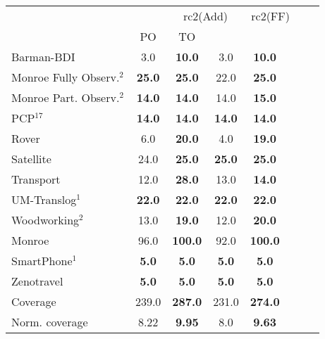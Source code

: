 \begin{tabular}{lccccccl} 
\toprule 
  && \multicolumn{2}{c}{rc2(Add)} & \multicolumn{2}{c}{rc2(FF)} \\ 
\cmidrule(lr){3-4} \cmidrule(lr){5-6}  
 &PO & TO  \\ 
\midrule 
Barman-BDI & 3.0 & \textbf{10.0} & 3.0 & \textbf{10.0}  \\ 
Monroe Fully Observ.$^{2}$ & \textbf{25.0} & \textbf{25.0} & 22.0 & \textbf{25.0}  \\ 
Monroe Part. Observ.$^{2}$ & \textbf{14.0} & \textbf{14.0} & 14.0 & \textbf{15.0}  \\ 
PCP$^{17}$ & \textbf{14.0} & \textbf{14.0} & \textbf{14.0} & \textbf{14.0}  \\ 
Rover & 6.0 & \textbf{20.0} & 4.0 & \textbf{19.0}  \\ 
Satellite & 24.0 & \textbf{25.0} & \textbf{25.0} & \textbf{25.0}  \\ 
Transport & 12.0 & \textbf{28.0} & 13.0 & \textbf{14.0}  \\ 
UM-Translog$^{1}$ & \textbf{22.0} & \textbf{22.0} & \textbf{22.0} & \textbf{22.0}  \\ 
Woodworking$^{2}$ & 13.0 & \textbf{19.0} & 12.0 & \textbf{20.0}  \\ 
\midrule 
 Monroe & 96.0 & \textbf{100.0} & 92.0 & \textbf{100.0}  \\ 
SmartPhone$^{1}$ & \textbf{5.0} & \textbf{5.0} & \textbf{5.0} & \textbf{5.0}  \\ 
Zenotravel & \textbf{5.0} & \textbf{5.0} & \textbf{5.0} & \textbf{5.0}  \\ 
\midrule 
 Coverage & 239.0 & \textbf{287.0} & 231.0 & \textbf{274.0}  \\ 
Norm. coverage & 8.22 & \textbf{9.95} & 8.0 & \textbf{9.63}  \\ 
\bottomrule 
 \end{tabular} 
